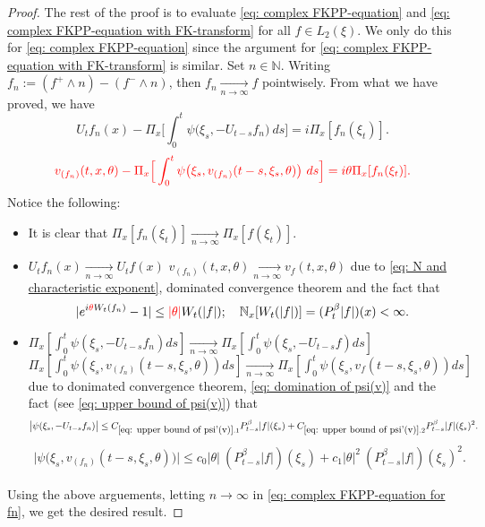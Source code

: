 \documentclass[12pt,oneside,english]{amsart}
\theoremstyle{plain}
\theoremstyle{definition}
\numberwithin{equation}{section}
\newcommand{\added}[1]{{\color{blue}#1}}\newcommand{\deleted}[1]{{\color{red}#1}}
\begin{document}
\begin{proof}
    The rest of the proof is to evaluate \eqref{eq: complex FKPP-equation} and \eqref{eq: complex FKPP-equation with FK-transform} for all $f\in L_2(\xi)$. We only do this for \eqref{eq: complex FKPP-equation} since the argument for \eqref{eq: complex FKPP-equation with FK-transform} is similar.
    Set $n \in \mathbb N$.
    Writing $f_n := (f^+ \wedge n) - (f^- \wedge n)$, then $f_n \xrightarrow[n\to \infty]{} f$ pointwisely.
    From what we have proved, we have
\deleted{
\begin{equation}
\label{eq: complex FKPP-equation for fn}
    U_tf_n(x) - \Pi_{x} \Big[\int_0^t \psi\big(\xi_s, - U_{t-s}f_n\big) ~ds\Big]
    = i \Pi_{x} [f_n(\xi_t)].
\end{equation}}
\begin{equation}
    \deleted{v_{(f_n)}(t,x,\theta) - \Pi_{x} \Big[\int_0^t \psi\big(\xi_s,v_{(f_n)}(t-s,\xi_s,\theta)\big) ~ds\Big]
    = i\theta \Pi_{x} [f_n(\xi_t)].}
\end{equation}
    Notice the following:
\begin{itemize}
\item
    It is clear that $\Pi_{x}[f_n(\xi_t)] \xrightarrow[n\to \infty]{} \Pi_{x}[f(\xi_t)]$.
\item
    \added{ $U_tf_n(x) \xrightarrow[n\to \infty]{} U_tf(x)$}\deleted{ $v_{(f_n)}(t,x,\theta) \xrightarrow[n\to \infty]{} v_f(t,x,\theta)$} due to \eqref{eq: N and characteristic exponent}, dominated convergence theorem and the fact that
\[
    |e^{i\deleted{\theta} W_t(f_n)} - 1| \leq \deleted{|\theta|} W_t(|f|);
    \quad \mathbb N_x[W_t(|f|)] = (P_t^\beta |f|)(x) < \infty.
\]
\item
    \added{ $\Pi_{x} [\int_0^t \psi(\xi_s,- U_{t-s}f_n)ds] \xrightarrow[n\to \infty]{} \Pi_{x} [\int_0^t \psi(\xi_s,- U_{t-s}f)ds]$}\deleted{ $\Pi_{x} [\int_0^t \psi(\xi_s,v_{(f_n)}(t-s,\xi_s,\theta))ds] \xrightarrow[n\to \infty]{} \Pi_{x} [\int_0^t \psi(\xi_s,v_{f}(t-s,\xi_s,\theta))ds]$} due to donimated convergence theorem, \eqref{eq: domination of psi(v)} and the fact (see \eqref{eq: upper bound of psi(v)}) that
\added{
\begin{align}
    \big|\psi(\xi_s,- U_{t-s}f_n)\big|
    \leq C_{\ref{eq: upper bound of psi'(v)}.1} P_{t-s}^\beta|f|(\xi_s)+C_{\ref{eq: upper bound of psi'(v)}.2} P_{t-s}^\beta|f|(\xi_s)^2.
\end{align}}
\deleted{
\begin{align}
    \big|\psi\big(\xi_s,v_{(f_n)}(t-s,\xi_s,\theta)\big)\big|
    \leq c_0|\theta|~(P^\beta_{t-s} |f|)(\xi_s)+c_1 |\theta|^2 ~(P^\beta_{t-s} |f|)(\xi_s)^2.
\end{align}
}
\end{itemize}
    Using the above arguements, letting $n \to \infty$ in \eqref{eq: complex FKPP-equation for fn}, we get the desired result.
\end{proof}
\end{document}
